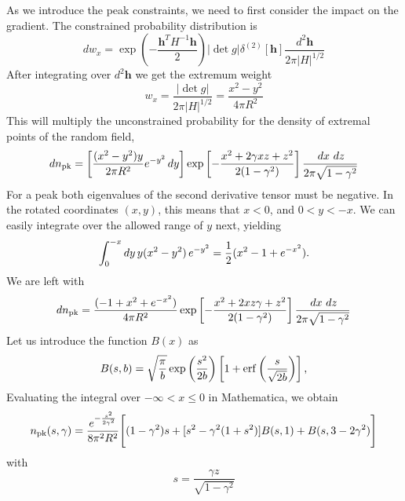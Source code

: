 \documentclass[twocolumn]{emulateapj}
\newcommand{\hh}{\mathbf{h}}
\begin{document}
As we introduce the peak constraints, we need to first consider the impact
on the gradient. The constrained probability distribution
is
\begin{equation}
	dw_x = \exp\left(-\frac{\hh^T H^{-1} \hh}{2}\right) 
			|\det g| \delta^{(2)}[\hh]			
			\frac{d^2 \hh} {2\pi|H|^{1/2}}
\end{equation}
After integrating over $d^2\hh$ we get the extremum weight
\begin{equation}
	w_x = \frac{|\det g|}{2\pi|H|^{1/2}} =\frac{x^2-y^2}{4 \pi R^2}
\end{equation}
This will multiply the unconstrained probability for the density of extremal 
points of the random field, 
\begin{equation}
		dn_{\rm{}pk}=\left[\frac{(x^2-y^2)y}{2\pi R^2} e^{-y^2}\,dy\right]
		\exp\left[-\frac{x^2 + 2\gamma x z + z^2}{2(1-\gamma^2)}\right] 
			\frac{\,dx\ dz}{2\pi \sqrt{1-\gamma^2}}
\end{equation}
For a peak both eigenvalues of the second derivative tensor must be negative. 
In the rotated coordinates $(x,y)$, this means that $x<0$, and $0<y<-x$.
We can easily integrate over the allowed range of $y$ next, yielding
\begin{equation}
	\int_0^{-x} dy\, y\/ (x^2-y^2)\, e^{-y^2} 
		=\frac{1}{2}(x^2-1+e^{-x^2}).
\end{equation}
We are left with
\begin{equation}
	dn_{\rm{}pk} = \frac{(-1 + x^2 +e^{-x^2})}{4\pi R^2}  
	\exp\left[-\frac{x^2 + 2 x z \gamma + z^2 }{2 (1-\gamma^2)}\right]
	\frac{\,dx\ dz}{2\pi \sqrt{1-\gamma^2}}
\end{equation}
Let us introduce the function $B(x)$ as
\begin{equation}
	B(s,b) = \sqrt{\frac{\pi}{b}} \exp\left({\frac{s^2}{2b}}\right)
	\left[1+ {\rm erf}\left( \frac{s}{\sqrt{2b}}\right)\right],
\end{equation}
Evaluating the integral over $-\infty<x\leq 0$ in Mathematica, we obtain
\begin{equation}
 n_{\rm{}pk}(s,\gamma)= 
		\frac{e^{-\frac{s^2}{2\gamma^2}}}{8\pi^2R^2}
		\Bigg[
			(1-\gamma^2)s +[s^2 - \gamma^2 (1 + s^2)] B(s,1)
			+B(s, 3- 2\gamma^2)
		\Bigg]
\end{equation}
with
\begin{equation}
	s = \frac{\gamma z}{\sqrt{1-\gamma^2}}
\end{equation}
\end{document}
